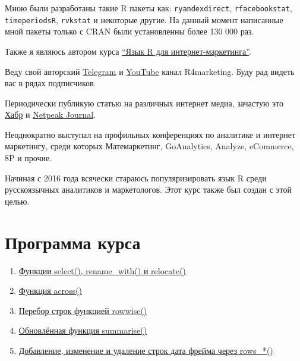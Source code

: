 \documentclass[
]{book}
\providecommand{\tightlist}{%
  \setlength{\itemsep}{0pt}\setlength{\parskip}{0pt}}
\begin{document}
Мною были разработаны такие R пакеты как: \texttt{ryandexdirect}, \texttt{rfacebookstat}, \texttt{timeperiodsR}, \texttt{rvkstat} и некоторые другие. На данный момент написанные мной пакеты только с CRAN были установленны более 130 000 раз.

Также я являюсь автором курса \href{https://needfordata.ru/r}{``Язык R для интернет-маркетинга''}.

Веду свой авторский \href{https://t.me/R4marketing}{Telegram} и \href{https://www.youtube.com/R4marketing/?sub_confirmation=1}{YouTube} канал R4marketing. Буду рад видеть вас в рядах подписчиков.

Периодически публикую статью на различных интернет медиа, зачастую это \href{https://habr.com/ru/users/selesnow/}{Хабр} и \href{https://netpeak.net/ru/blog/user/publication/826/}{Netpeak Journal}.

Неоднократно выступал на профильных конференциях по аналитике и интернет маркетингу, среди которых Матемаркетинг, GoAnalytics, Analyze, eCommerce, 8P и прочие.

Начиная с 2016 года всячески стараюсь популяризировать язык R среди русскоязычных аналитиков и маркетологов. Этот курс также был создан с этой целью.

\hypertarget{ux43fux440ux43eux433ux440ux430ux43cux43cux430-ux43aux443ux440ux441ux430}{%
\section*{Программа курса}\label{ux43fux440ux43eux433ux440ux430ux43cux43cux430-ux43aux443ux440ux441ux430}}

\begin{enumerate}
\def\labelenumi{\arabic{enumi}.}
\tightlist
\item
  \href{функции-select-rename_with-и-relocate.html}{Функции select(), rename\_with() и relocate()}
\item
  \href{функция-across.html}{Функция across()}
\item
  \href{перебор-строк-функцией-rowwise.html}{Перебор строк функцией rowwise()}
\item
  \href{обновлённая-функция-summarise.html}{Обновлённая функция summarise()}
\item
  \href{добавление-изменение-и-удаление-строк-дата-фрейма-через-rows_.html}{Добавление, изменение и удаление строк дата фрейма через rows\_*()}
\end{enumerate}
\end{document}
